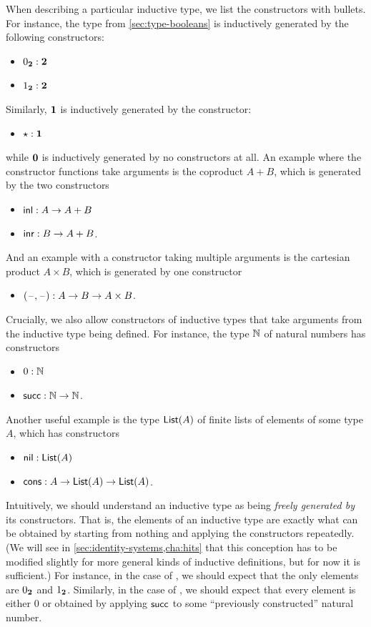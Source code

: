 When describing a particular inductive type, we list the constructors with bullets.
For instance, the type \bool from \cref{sec:type-booleans} is inductively generated by the following constructors:
\begin{itemize}
\item ${0_{\mathbf{2}}}:\mathbf{2}$
\item ${1_{\mathbf{2}}}:\mathbf{2}$
\end{itemize}
Similarly, $\mathbf{1}$ is inductively generated by the constructor:
\begin{itemize}
\item $\star:\mathbf{1}$
\end{itemize}
while $\mathbf{0}$ is inductively generated by no constructors at all.
An example where the constructor functions take arguments is the coproduct $A+B$, which is generated by the two constructors
\begin{itemize}
\item ${\mathsf{inl}}:A\to A+B$
\item ${\mathsf{inr}}:B\to A+B$.
\end{itemize}
And an example with a constructor taking multiple arguments is the cartesian product $A\times B$, which is generated by one constructor
\begin{itemize}
\item ${\mathopen{}(\mathord{\hspace{1pt}\text{--}\hspace{1pt}}, \mathord{\hspace{1pt}\text{--}\hspace{1pt}})\mathclose{}} : A\to B \to A\times B$.
\end{itemize}
Crucially, we also allow constructors of inductive types that take arguments from the inductive type being defined.
For instance, the type $\mathbb{N}$ of natural numbers has constructors
\begin{itemize}
\item $0:\mathbb{N}$
\item $\mathsf{succ}:\mathbb{N}\to\mathbb{N}$.
\end{itemize}
%
%
Another useful example is the type $\mathsf{List}(A)$ of finite lists of elements of some type $A$, which has constructors
\begin{itemize}\label{list_constructors}
\item $\mathsf{nil}:\mathsf{List}(A)$
\item $\mathsf{cons}:A\to \mathsf{List}(A) \to \mathsf{List}(A)$.
\end{itemize}

%
Intuitively, we should understand an inductive type as being \emph{freely generated by} its constructors.
That is, the elements of an inductive type are exactly what can be obtained by starting from nothing and applying the constructors repeatedly.
(We will see in \cref{sec:identity-systems,cha:hits} that this conception has to be modified slightly for more general kinds of inductive definitions, but for now it is sufficient.)
For instance, in the case of \bool, we should expect that the only elements are ${0_{\mathbf{2}}}$ and ${1_{\mathbf{2}}}$.
Similarly, in the case of \nat, we should expect that every element is either $0$ or obtained by applying $\mathsf{succ}$ to some ``previously constructed'' natural number.

